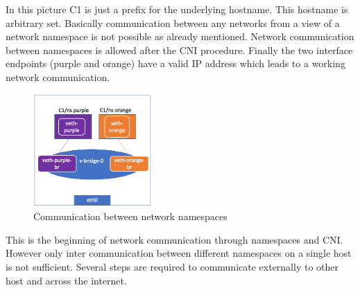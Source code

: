 In this picture C1 is just a prefix for the underlying hostname. This hostname is arbitrary set. 
Basically communication between any networks from a view of a network namespace is not possible as already mentioned. 
Network communication between namespaces is allowed after the CNI procedure. 
Finally the two interface endpoints (purple and orange) have a valid IP address which leads to a working network communication.
\begin{figure}[htbp]
 \centering
 \includegraphics[width=0.4\textwidth]{gfx/examples/network_ns}
 \caption{Communication between network namespaces}
\label{sec:intro:containerization:linux_namespaces:netowork_ns}
\end{figure}
This is the beginning of network communication through namespaces and CNI. 
However only inter communication between different namespaces on a single host is not sufficient. 
Several steps are required to communicate externally to other host and across the internet.

